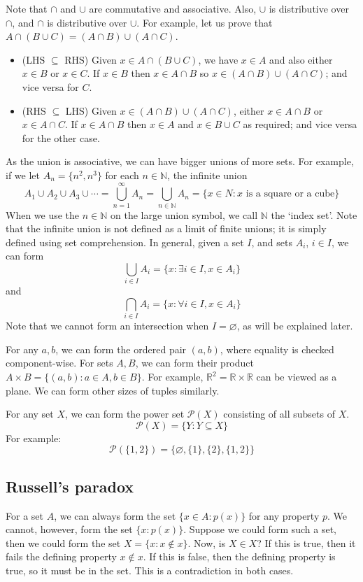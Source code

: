 Note that \(\cap\) and \(\cup\) are commutative and associative.
Also, \(\cup\) is distributive over \(\cap\), and \(\cap\) is distributive over \(\cup\).
For example, let us prove that \(A \cap (B \cup C) = (A \cap B) \cup (A \cap C)\).
\begin{itemize}
	\item (LHS \(\subseteq\) RHS) Given \(x \in A \cap (B \cup C)\), we have \(x \in A\) and also either \(x \in B\) or \(x \in C\).
	      If \(x \in B\) then \(x \in A \cap B\) so \(x \in (A \cap B) \cup (A \cap C)\); and vice versa for \(C\).
	\item (RHS \(\subseteq\) LHS) Given \(x \in (A \cap B) \cup (A \cap C)\), either \(x \in A \cap B\) or \(x \in A \cap C\).
	      If \(x \in A \cap B\) then \(x \in A\) and \(x \in B \cup C\) as required; and vice versa for the other case.
\end{itemize}
As the union is associative, we can have bigger unions of more sets.
For example, if we let \(A_n = \{ n^2, n^3 \}\) for each \(n \in \mathbb N\), the infinite union
\[
	A_1 \cup A_2 \cup A_3 \cup \cdots = \bigcup_{n=1}^\infty A_n = \bigcup_{n \in \mathbb N} A_n = \{ x \in N: x \text{ is a square or a cube} \}
\]
When we use the \(n \in \mathbb N\) on the large union symbol, we call \(\mathbb N\) the `index set'.
Note that the infinite union is not defined as a limit of finite unions; it is simply defined using set comprehension.
In general, given a set \(I\), and sets \(A_i\), \(i \in I\), we can form
\[
	\bigcup_{i \in I}A_i = \{ x: \exists i \in I, x \in A_i \}
\]
and
\[
	\bigcap_{i \in I}A_i = \{ x: \forall i \in I, x \in A_i \}
\]
Note that we cannot form an intersection when \(I = \varnothing\), as will be explained later.

For any \(a, b\), we can form the ordered pair \((a, b)\), where equality is checked component-wise.
For sets \(A, B\), we can form their product \(A \times B = \{ (a, b) : a \in A, b \in B \}\).
For example, \(\mathbb R^2 = \mathbb R \times \mathbb R\) can be viewed as a plane.
We can form other sizes of tuples similarly.

For any set \(X\), we can form the power set \(\mathcal P(X)\) consisting of all subsets of \(X\).
\[
	\mathcal P(X) = \{ Y: Y \subseteq X \}
\]
For example:
\[
	\mathcal P(\{ 1, 2 \}) = \{ \varnothing, \{ 1 \}, \{ 2 \}, \{ 1, 2\} \}
\]

\subsection{Russell's paradox}
For a set \(A\), we can always form the set \(\{ x \in A: p(x) \}\) for any property \(p\).
We cannot, however, form the set \(\{ x: p(x) \}\).
Suppose we could form such a set, then we could form the set \(X = \{ x: x \notin x \}\).
Now, is \(X \in X\)?
If this is true, then it fails the defining property \(x \notin x\).
If this is false, then the defining property is true, so it must be in the set.
This is a contradiction in both cases.

